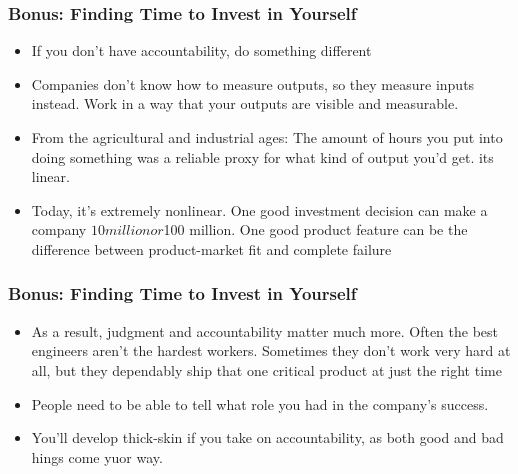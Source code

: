 \begin{frame}[fragile]
\frametitle{Bonus: Finding Time to Invest in Yourself}
\begin{itemize}
\item If you don’t have accountability, do something different
\item Companies don’t know
how to measure outputs, so they measure inputs instead. Work in a way that your outputs are visible and
measurable. 
\item   From the agricultural and industrial ages: The amount of hours you put into doing something was a reliable
proxy for what kind of output you’d get.  its linear.
\item Today, it’s extremely nonlinear. One good investment decision can make a company $10 million or $100
million. One good product feature can be the difference between product-market fit and complete failure
\end{itemize}
\end{frame}

\begin{frame}[fragile]
\frametitle{Bonus: Finding Time to Invest in Yourself}
\begin{itemize}
\item As a result, judgment and accountability matter much more. Often the best engineers aren’t the hardest
workers. Sometimes they don’t work very hard at all, but they dependably ship that one critical product
at just the right time
\item People need to be able to tell what role you had in the company’s success. 
\item You’ll develop thick-skin if you take on accountability, as both good and bad hings come yuor way.
\end{itemize}
\end{frame}

